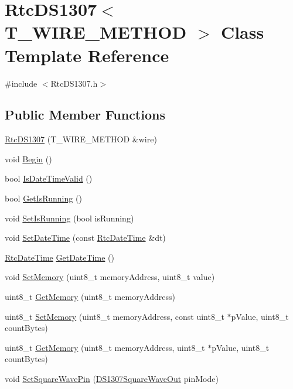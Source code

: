 \hypertarget{class_rtc_d_s1307}{}\section{Rtc\+D\+S1307$<$ T\+\_\+\+W\+I\+R\+E\+\_\+\+M\+E\+T\+H\+OD $>$ Class Template Reference}
\label{class_rtc_d_s1307}


{\ttfamily \#include $<$Rtc\+D\+S1307.\+h$>$}

\subsection*{Public Member Functions}
\begin{DoxyCompactItemize}
\item 
\hyperlink{class_rtc_d_s1307_a3cc15257ca35d2016ea9cd952fce19fc}{Rtc\+D\+S1307} (T\+\_\+\+W\+I\+R\+E\+\_\+\+M\+E\+T\+H\+OD \&wire)
\item 
void \hyperlink{class_rtc_d_s1307_a7c9ca31bbee2bf317f9f7d0858670f77}{Begin} ()
\item 
bool \hyperlink{class_rtc_d_s1307_a59c23764273ce04cd12c7b24e05d6aad}{Is\+Date\+Time\+Valid} ()
\item 
bool \hyperlink{class_rtc_d_s1307_abef3ed4e0898645e62d293a5d8e3c8db}{Get\+Is\+Running} ()
\item 
void \hyperlink{class_rtc_d_s1307_a48280782960f2d3d6bfcc14db3382475}{Set\+Is\+Running} (bool is\+Running)
\item 
void \hyperlink{class_rtc_d_s1307_aa03bfac5015bbe14843c66c88132e8ef}{Set\+Date\+Time} (const \hyperlink{class_rtc_date_time}{Rtc\+Date\+Time} \&dt)
\item 
\hyperlink{class_rtc_date_time}{Rtc\+Date\+Time} \hyperlink{class_rtc_d_s1307_ae8005e50deb2e86d623005dda35695e2}{Get\+Date\+Time} ()
\item 
void \hyperlink{class_rtc_d_s1307_aa2b6fa5bac40e4eea1ffb6b01cd291bd}{Set\+Memory} (uint8\+\_\+t memory\+Address, uint8\+\_\+t value)
\item 
uint8\+\_\+t \hyperlink{class_rtc_d_s1307_a551c58ba184626780b1f806cc9eb124d}{Get\+Memory} (uint8\+\_\+t memory\+Address)
\item 
uint8\+\_\+t \hyperlink{class_rtc_d_s1307_ac4f358e59516475f5af176c47ccee7a2}{Set\+Memory} (uint8\+\_\+t memory\+Address, const uint8\+\_\+t $\ast$p\+Value, uint8\+\_\+t count\+Bytes)
\item 
uint8\+\_\+t \hyperlink{class_rtc_d_s1307_a784a1fbf6367c4a73a95748cf9f94e23}{Get\+Memory} (uint8\+\_\+t memory\+Address, uint8\+\_\+t $\ast$p\+Value, uint8\+\_\+t count\+Bytes)
\item 
void \hyperlink{class_rtc_d_s1307_afacd4cf1293032ece5df359e7e7c38d5}{Set\+Square\+Wave\+Pin} (\hyperlink{_rtc_d_s1307_8h_a85910be6fed3842f050e1e3e3c03f229}{D\+S1307\+Square\+Wave\+Out} pin\+Mode)
\end{DoxyCompactItemize}


